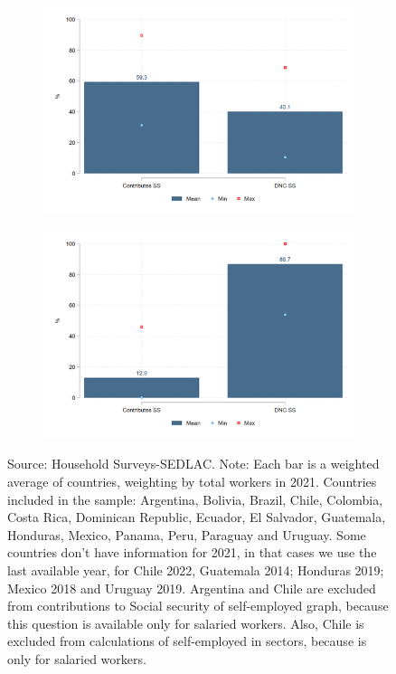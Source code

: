 \documentclass[english]{article}
\begin{document}
\begin{itemize}
\begin{figure}[htb!]
\begin{subfigure}{.5\textwidth}
  \centering
  \includegraphics[width=1\textwidth]{latex/figures/Snapshot/Salaried-SS.png}
  \label{fig:salariedSS}
\end{subfigure}%
\begin{subfigure}{.5\textwidth}
  \centering
\includegraphics[width=1\textwidth]{latex/figures/Snapshot/Self employed-SS.png}
  \label{fig:selfSS}
\end{subfigure}
\justifying
\footnotesize{Source: Household Surveys-SEDLAC.}
\footnotesize{Note: Each bar is a weighted average of countries, weighting by total workers in 2021. Countries included in the sample: Argentina, Bolivia, Brazil, Chile, Colombia, Costa Rica, Dominican Republic, Ecuador, El Salvador, Guatemala, Honduras, Mexico, Panama, Peru, Paraguay and Uruguay. Some countries don’t have information for 2021, in that cases we use the last available year, for Chile 2022, Guatemala 2014; Honduras 2019; Mexico 2018 and Uruguay 2019. Argentina and Chile are excluded from contributions to Social security of self-employed graph, because this question is available only for salaried workers. Also, Chile is excluded from calculations of self-employed in sectors, because is only for salaried workers.}


\end{figure}
\end{itemize}
\end{document}
